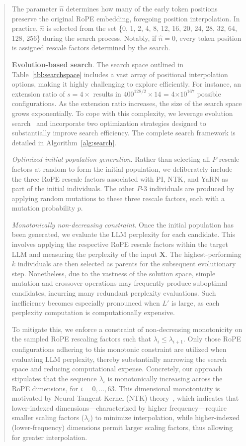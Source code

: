 \begin{abstract}
The parameter $\hat{n}$ determines how many of the early token positions preserve the original RoPE embedding, foregoing position interpolation. In practice, $\hat{n}$ is selected from the set \{0, 1, 2, 4, 8, 12, 16, 20, 24, 28, 32, 64, 128, 256\} during the search process. Notably, if $\hat{n}=0$, every token position is assigned rescale factors determined by the search.

\textbf{Evolution-based search}. The search space outlined in Table~\ref{tbl:searchspace} includes a vast array of positional interpolation options, making it highly challenging to explore efficiently. For instance, an extension ratio of $s=4\times$ results in $400^{128/2}\times14$ = 4$\times10^{167}$ possible configurations. As the extension ratio increases, the size of the search space grows exponentially. To cope with this complexity, we leverage evolution search~\cite{guo2020single} and incorporate two optimization strategies designed to substantially improve search efficiency. The complete search framework is detailed in Algorithm~\ref{alg:search}.

\textit{Optimized initial population generation}. Rather than selecting all $P$ rescale factors at random to form the initial population, we deliberately include the three RoPE rescale factors associated with PI, NTK, and YaRN as part of the initial individuals. The other $P$-3 individuals are produced by applying random mutations to these three rescale factors, each with a mutation probability $p$.

\textit{Monotonically non-decreasing constraint}. Once the initial population has been generated, we evaluate the LLM perplexity for each candidate. This involves applying the respective RoPE rescale factors within the target LLM and measuring the perplexity of the input $\mathbf{X}$. The highest-performing $k$ individuals are then selected as parents for the subsequent evolutionary step. Nonetheless, due to the vastness of the solution space, simple mutation and crossover operations may frequently produce suboptimal candidates, incurring many redundant perplexity evaluations. Such inefficiency becomes especially pronounced when $L'$ is large, as each perplexity computation is computationally expensive.

To mitigate this, we enforce a constraint of non-decreasing monotonicity on the sampled RoPE rescaling factors such that $\lambda_i \leq \lambda_{i+1}$. Only those RoPE configurations adhering to this monotonic constraint are utilized when evaluating LLM perplexity, thereby substantially narrowing the search space and reducing computational expense. Concretely, our approach stipulates that the sequence $\lambda_i$ is monotonically increasing across the RoPE dimensions, for $i=0,\ldots,63$. This dimensional monotonicity is motivated by Neural Tangent Kernel (NTK) theory~\cite{jacot2018neural,tancik2020fourier,ntk}, which indicates that lower-indexed dimensions—characterized by higher frequency—require smaller scaling factors ($\lambda_i$) to minimize interpolation, while higher-indexed (lower-frequency) dimensions permit larger scaling factors, thus allowing for greater interpolation.


\end{abstract}
